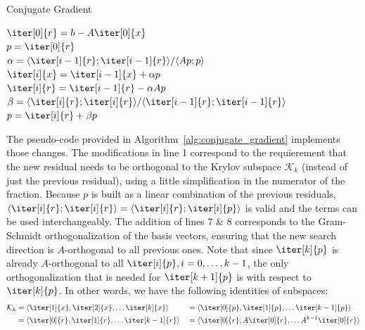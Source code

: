 \begin{algorithm}[h]
  \caption{Conjugate Gradient}
  \label{alg:conjugate_gradient}
  \SetAlgoLined
  \DontPrintSemicolon
  $\iter[0]{r} = b-A\iter[0]{x}$ \\
  $p = \iter[0]{r}$ \\
   {
    $\alpha = \langle \iter[i-1]{r};\iter[i-1]{r} \rangle / \langle Ap;p \rangle$ \\
    $\iter[i]{x} = \iter[i-1]{x}+\alpha p$ \\
    $\iter[i]{r} = \iter[i-1]{r} - \alpha Ap$ \\
    $\beta = \langle \iter[i]{r};\iter[i]{r} \rangle / \langle \iter[i-1]{r};\iter[i-1]{r} \rangle$ \\
    $p = \iter[i]{r} + \beta p$ \\
  }
\end{algorithm}

\noindent The pseudo-code provided in Algorithm~\hyperref[alg:conjugate_gradient]{\ref{alg:conjugate_gradient}} implements those changes. The modifications in line 1 correspond to the requierement that the new residual needs to be orthogonal to the Krylov subspace $\mathcal{K}_k$ (instead of just the previous residual), using a little simplification in the numerator of the fraction. Because $p$ is built as a linear combination of the previous residuals, $\langle \iter[i]{r};\iter[i]{r} \rangle = \langle \iter[i]{r};\iter[i]{p} \rangle$ is valid and the terms can be used interchangeably. The addition of lines 7 \& 8 corresponds to the Gram-Schmidt orthogonalization of the basis vectors, ensuring that the new search direction is $A$-orthogonal to all previous ones. Note that since $\iter[k]{p}$ is already $A$-orthogonal to all $\iter[i]{p}, i=0,\dots,k-1$, the only orthogonalization that is needed for $\iter[k+1]{p}$ is with respect to $\iter[k]{p}$. In other words, we have the following identities of subspaces:
\begin{equation}
  \begin{aligned}
    \mathcal{K}_k 
    & =\langle \iter[1]{x}, \iter[2]{x}, \dots \iter[k]{x} \rangle 
   & & = \langle \iter[0]{p}, \iter[1]{p}, \dots \iter[k-1]{p} \rangle \\
    & = \langle \iter[0]{r}, \iter[1]{r}, \dots \iter[k-1]{r} \rangle
   & & =\langle \iter[0]{r}, A\iter[0]{r}, \dots A^{k-1}\iter[0]{r}\rangle\\
  \end{aligned}
\end{equation}

